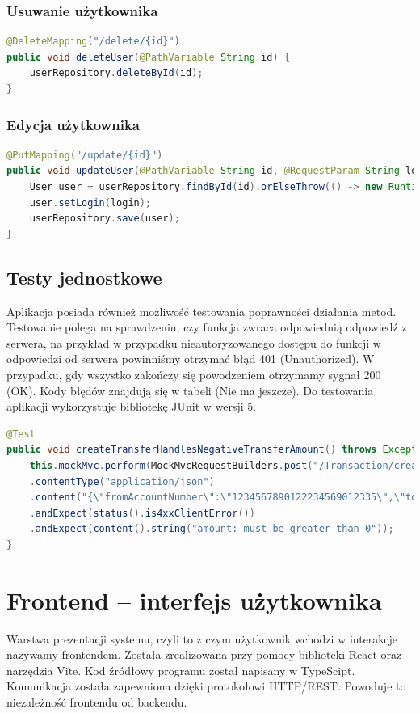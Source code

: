 \subsubsection*{Usuwanie użytkownika}
\begin{lstlisting}[language={Java}, caption={Usuwanie użytkownika}, label={lst:java-delete}]
@DeleteMapping("/delete/{id}")
public void deleteUser(@PathVariable String id) {
	userRepository.deleteById(id);
}
\end{lstlisting}
\subsubsection*{Edycja użytkownika}
\begin{lstlisting}[language={Java}, caption={Edycja użytkownika}, label={lst:java-update}]
@PutMapping("/update/{id}")
public void updateUser(@PathVariable String id, @RequestParam String login) {
	User user = userRepository.findById(id).orElseThrow(() -> new RuntimeException("User not found"));
	user.setLogin(login);
	userRepository.save(user);
}
\end{lstlisting}
\subsection*{Testy jednostkowe}
Aplikacja posiada również możliwość testowania poprawności działania metod. Testowanie polega na sprawdzeniu, czy funkcja zwraca odpowiednią odpowiedź z serwera, na przykład w przypadku nieautoryzowanego dostępu do funkcji w odpowiedzi od serwera powinniśmy otrzymać błąd 401 (Unauthorized). W przypadku, gdy wszystko zakończy się powodzeniem otrzymamy sygnał 200 (OK). Kody błędów znajdują się w tabeli (Nie ma jeszcze). Do testowania aplikacji wykorzystuje bibliotekę JUnit w wersji 5.
\begin{lstlisting}[language={Java}, caption={Przykładowy test}, label={lst:java-UnitTest}]
@Test
public void createTransferHandlesNegativeTransferAmount() throws Exception {
	this.mockMvc.perform(MockMvcRequestBuilders.post("/Transaction/create/transfer")
	.contentType("application/json")
	.content("{\"fromAccountNumber\":\"1234567890122234569012335\",\"toAccountNumber\":\"1234567890122234569012335\",\"amount\":-50.0}"))
	.andExpect(status().is4xxClientError())
	.andExpect(content().string("amount: must be greater than 0"));
}
\end{lstlisting}
\section{Frontend – interfejs użytkownika}
Warstwa prezentacji systemu, czyli to z czym użytkownik wchodzi w interakcje nazywamy frontendem. Została zrealizowana przy pomocy biblioteki React oraz narzędzia Vite. Kod źródłowy programu został napisany w TypeScipt. Komunikacja została zapewniona dzięki protokołowi HTTP/REST. Powoduje to niezależność frontendu od backendu.
